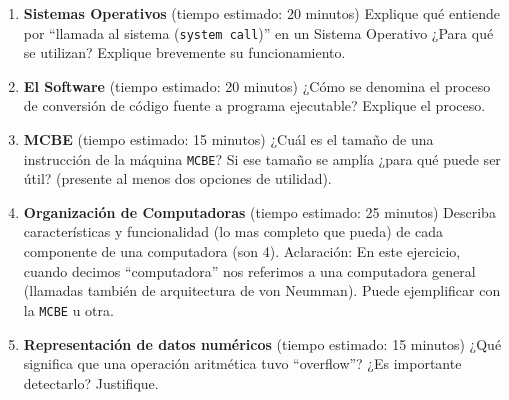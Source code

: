 \documentclass[12pt]{article}
\def\maketitle{

\makeatletter{
    \color{blue} \centering \huge \sc
    \textbf{
        Examen final regular
    }\\
    \par
}
\makeatother

\makeatletter


}
\begin{document}
\begin{minipage}[c]{\linewidth}
\thispagestyle{empty}
\maketitle
\setlength{\parindent}{1pt}

\begin{enumerate}[topsep=4pt,itemsep=2pt,partopsep=2pt, parsep=2pt]

    \item \textbf{Sistemas Operativos}
        \small{(tiempo estimado: 20 minutos)} Explique qué entiende por
        ``llamada al sistema (\texttt{system call})'' en un Sistema Operativo
        ¿Para qué se utilizan? Explique brevemente su funcionamiento.

    \item \textbf{El Software}
        \small{(tiempo estimado: 20 minutos)} ¿Cómo se denomina el proceso de
        conversión de código fuente a programa ejecutable? Explique el
        proceso.

    \item \textbf{MCBE}
        \small{(tiempo estimado: 15 minutos)} ¿Cuál es el tamaño de una
        instrucción de la máquina \texttt{MCBE}? Si ese tamaño se amplía ¿para
        qué puede ser útil? (presente al menos dos opciones de utilidad).

    \item \textbf{Organización de Computadoras}
        \small{(tiempo estimado: 25 minutos)}
        Describa características y funcionalidad (lo mas completo que pueda)
        de cada componente de una computadora (son 4). Aclaración: En este
        ejercicio, cuando decimos ``computadora'' nos referimos a una
        computadora general (llamadas también de arquitectura de von Neumman).
        Puede ejemplificar con la \texttt{MCBE} u otra.

    \item \textbf{Representación de datos numéricos}
        \small{(tiempo estimado: 15 minutos)}
        ¿Qué significa que una operación aritmética tuvo ``overflow''? ¿Es
        importante detectarlo? Justifique.

\end{enumerate}
\end{minipage}
\end{document}
